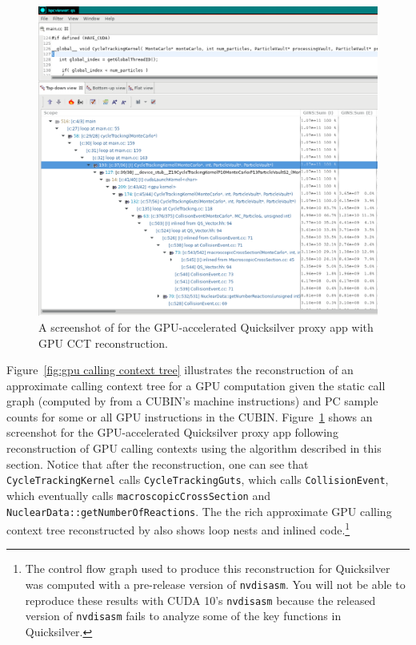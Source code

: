 \begin{figure}[t]
\centering
\includegraphics[width=\textwidth]{qs-cct.pdf}
\caption{A screenshot of \hpcviewer{} for the GPU-accelerated Quicksilver proxy app with GPU CCT reconstruction.}
\label{qs-cct}
\end{figure}

Figure~\ref{fig:gpu calling context tree} illustrates the reconstruction of an approximate calling context tree for a GPU computation given the static call graph (computed by \hpcstruct{} from a CUBIN's machine instructions) and PC sample counts for some or all GPU instructions in the CUBIN. Figure~\ref{qs-cct} shows an \hpcviewer{} screenshot for the GPU-accelerated Quicksilver proxy app following reconstruction of GPU calling contexts using the algorithm described in this section. Notice that after the reconstruction, one can see that \verb|CycleTrackingKernel| calls \verb|CycleTrackingGuts|, which calls \verb|CollisionEvent|, which eventually calls  \verb|macroscopicCrossSection| and \verb|NuclearData::getNumberOfReactions|. The the rich  approximate GPU calling context tree reconstructed by \hpcprof{} also shows loop nests and inlined code.\footnote{The control flow graph used to produce this reconstruction for Quicksilver was computed with a pre-release version of {\tt nvdisasm}. You will not be able to reproduce these results with CUDA 10's {\tt nvdisasm} because the released version of {\tt nvdisasm} fails to analyze some of the key functions in Quicksilver.}



